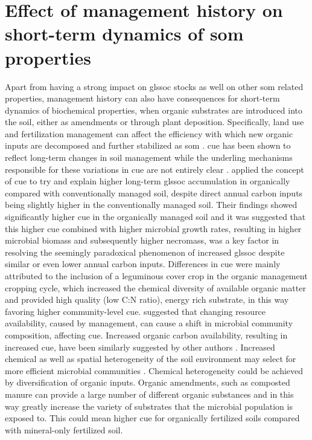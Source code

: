 \section{Effect of management history on short-term dynamics of \gls{som} properties}

		Apart from having a strong impact on gls{soc} stocks as well on other \gls{som} related properties, management history can also have consequences for short-term dynamics of biochemical properties, when organic substrates are introduced into the soil, either as amendments or through plant deposition. Specifically, land use and fertilization management can affect the efficiency with which new organic inputs are decomposed and further stabilized as \gls{som} \citep{lee2014}. \gls{cue} has been shown to reflect long-term changes in soil management  while the underling mechanisms responsible for these variations in \gls{cue} are not entirely clear \citep{kallenbach2019}.
		\citet{kallenbach2015} applied the concept of \gls{cue} to try and explain higher long-term gls{soc} accumulation in organically compared with conventionally managed soil, despite direct annual carbon inputs being slightly higher in the conventionally managed soil. Their findings showed significantly higher \gls{cue} in the organically managed soil and it was suggested that this higher \gls{cue} combined with higher microbial growth rates, resulting in higher microbial biomass and subsequently higher necromass, was a key factor in resolving the seemingly paradoxical phenomenon of increased gls{soc} despite similar or even lower annual carbon inputs. Differences in \gls{cue} were mainly attributed to the inclusion of a leguminous cover crop in the organic management cropping cycle, which increased the chemical diversity of available organic matter and provided high quality (low C:N ratio), energy rich substrate, in this way favoring higher community-level \gls{cue}.
		\citet{roller2015} suggested that changing resource availability, caused by management, can cause a shift in microbial community composition, affecting \gls{cue}. Increased organic carbon availability, resulting in increased \gls{cue}, have been similarly suggested by other authors \citep{cotrufo2013}.
		Increased chemical as well as spatial heterogeneity of the soil environment may select for more efficient microbial communities \citep{pfeiffer2001, nunan2017}. Chemical heterogeneity could be achieved by diversification of organic inputs. Organic amendments, such as composted manure can provide a large number of different organic substances \citep{zbytniewski2005} and in this way greatly increase the  variety of substrates that the microbial population is exposed to. This could mean higher \gls{cue} for organically fertilized soils compared with mineral-only fertilized soil.
